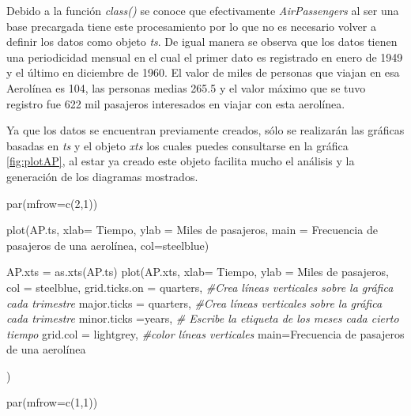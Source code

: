 \documentclass[
  spanish,
]{book}
\newenvironment{Shaded}{\begin{snugshade}}{\end{snugshade}}
\newcommand{\AttributeTok}[1]{\textcolor[rgb]{0.77,0.63,0.00}{#1}}
\newcommand{\CommentTok}[1]{\textcolor[rgb]{0.56,0.35,0.01}{\textit{#1}}}
\newcommand{\DecValTok}[1]{\textcolor[rgb]{0.00,0.00,0.81}{#1}}
\newcommand{\FunctionTok}[1]{\textcolor[rgb]{0.00,0.00,0.00}{#1}}
\newcommand{\NormalTok}[1]{#1}
\newcommand{\OtherTok}[1]{\textcolor[rgb]{0.56,0.35,0.01}{#1}}
\newcommand{\StringTok}[1]{\textcolor[rgb]{0.31,0.60,0.02}{#1}}
\theoremstyle{remark}
\begin{document}
Debido a la función \emph{class()} se conoce que efectivamente \emph{AirPassengers} al ser una base precargada tiene este procesamiento por lo que no es necesario volver a definir los datos como objeto \emph{ts}. De igual manera se observa que los datos tienen una periodicidad mensual en el cual el primer dato es registrado en enero de 1949 y el último en diciembre de 1960. El valor de miles de personas que viajan en esa Aerolínea es 104, las personas medias 265.5 y el valor máximo que se tuvo registro fue 622 mil pasajeros interesados en viajar con esta aerolínea.

Ya que los datos se encuentran previamente creados, sólo se realizarán las gráficas basadas en \emph{ts} y el objeto \emph{xts} los cuales puedes consultarse en la gráfica \ref{fig:plotAP}, al estar ya creado este objeto facilita mucho el análisis y la generación de los diagramas mostrados.

\begin{Shaded}
\begin{Highlighting}[]
\FunctionTok{par}\NormalTok{(}\AttributeTok{mfrow=}\FunctionTok{c}\NormalTok{(}\DecValTok{2}\NormalTok{,}\DecValTok{1}\NormalTok{))}

\FunctionTok{plot}\NormalTok{(AP.ts,  }\AttributeTok{xlab=} \StringTok{\textquotesingle{}Tiempo\textquotesingle{}}\NormalTok{, }
     \AttributeTok{ylab =} \StringTok{\textquotesingle{}Miles de pasajeros\textquotesingle{}}\NormalTok{,}
     \AttributeTok{main =} \StringTok{\textquotesingle{}Frecuencia de pasajeros de una aerolínea\textquotesingle{}}\NormalTok{,}
     \AttributeTok{col=}\StringTok{\textquotesingle{}steelblue\textquotesingle{}}\NormalTok{)}

\NormalTok{AP.xts }\OtherTok{=} \FunctionTok{as.xts}\NormalTok{(AP.ts)}
\FunctionTok{plot}\NormalTok{(AP.xts,}
      \AttributeTok{xlab=} \StringTok{\textquotesingle{}Tiempo\textquotesingle{}}\NormalTok{, }
     \AttributeTok{ylab =} \StringTok{\textquotesingle{}Miles de pasajeros\textquotesingle{}}\NormalTok{,}
      \AttributeTok{col =} \StringTok{\textquotesingle{}steelblue\textquotesingle{}}\NormalTok{, }
     \AttributeTok{grid.ticks.on =} \StringTok{\textquotesingle{}quarters\textquotesingle{}}\NormalTok{, }\CommentTok{\#Crea líneas verticales sobre la gráfica cada trimestre}
     \AttributeTok{major.ticks =} \StringTok{\textquotesingle{}quarters\textquotesingle{}}\NormalTok{,  }\CommentTok{\#Crea líneas verticales sobre la gráfica cada trimestre}
     \AttributeTok{minor.ticks =}\StringTok{\textquotesingle{}years\textquotesingle{}}\NormalTok{, }\CommentTok{\# Escribe la etiqueta de los meses cada cierto tiempo}
     \AttributeTok{grid.col =} \StringTok{\textquotesingle{}lightgrey\textquotesingle{}}\NormalTok{, }\CommentTok{\#color líneas verticales}
     \AttributeTok{main=}\StringTok{\textquotesingle{}Frecuencia de pasajeros de una aerolínea\textquotesingle{}}
     
\NormalTok{     )}



\FunctionTok{par}\NormalTok{(}\AttributeTok{mfrow=}\FunctionTok{c}\NormalTok{(}\DecValTok{1}\NormalTok{,}\DecValTok{1}\NormalTok{))}
\end{Highlighting}
\end{Shaded}
\end{document}
